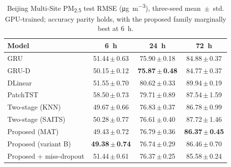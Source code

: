 \documentclass[review,3p,times]{elsarticle}
\newcommand{\ugm}{\si{\micro\gram\per\cubic\metre}}
\newcommand{\pmf}{PM\textsubscript{2.5}}
\begin{document}
\begin{table}[t]
\centering
\caption{Beijing Multi-Site \pmf{} test RMSE (\ugm), three-seed mean~$\pm$~std.
GPU-trained; accuracy parity holds, with the proposed family marginally best at
\SI{6}{\hour}.}
\label{tab:beijing}
\small
\begin{tabular}{lccc}
\toprule
Model & \SI{6}{\hour} & \SI{24}{\hour} & \SI{72}{\hour} \\
\midrule
GRU                    & 51.44\,$\pm$\,0.63 & 75.90\,$\pm$\,0.18 & 84.88\,$\pm$\,0.37 \\
GRU-D                  & 50.15\,$\pm$\,0.12 & \textbf{75.87\,$\pm$\,0.48} & 84.77\,$\pm$\,0.37 \\
DLinear                & 51.55\,$\pm$\,0.70 & 80.62\,$\pm$\,0.33 & 89.94\,$\pm$\,0.19 \\
PatchTST               & 58.50\,$\pm$\,0.73 & 79.71\,$\pm$\,0.89 & 87.54\,$\pm$\,1.59 \\
Two-stage (KNN)        & 49.67\,$\pm$\,0.66 & 76.83\,$\pm$\,0.37 & 86.78\,$\pm$\,0.99 \\
Two-stage (SAITS)      & 50.28\,$\pm$\,0.77 & 76.61\,$\pm$\,0.40 & 87.72\,$\pm$\,1.46 \\
Proposed (MAT)         & 49.43\,$\pm$\,0.72 & 76.79\,$\pm$\,0.36 & \textbf{86.37\,$\pm$\,0.45} \\
Proposed (variant B)   & \textbf{49.38\,$\pm$\,0.74} & 76.74\,$\pm$\,0.29 & 86.46\,$\pm$\,0.70 \\
Proposed + miss-dropout& 51.44\,$\pm$\,0.61 & 76.37\,$\pm$\,0.25 & 85.58\,$\pm$\,0.24 \\
\bottomrule
\end{tabular}
\end{table}
\end{document}
